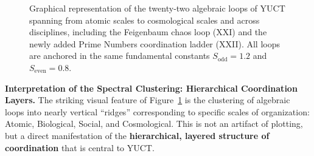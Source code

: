 \documentclass[12pt,a4paper]{article}
\begin{document}
\begin{figure}[htbp]
		\caption{Graphical representation of the twenty-two algebraic loops of YUCT spanning from atomic scales to cosmological scales and across disciplines, including the Feigenbaum chaos loop (XXI) and the newly added Prime Numbers coordination ladder (XXII). All loops are anchored in the same fundamental constants $S_{\mathrm{odd}} = 1.2$ and $S_{\mathrm{even}} = 0.8$.}
		\label{fig:twentyone-loops}
	\end{figure}
	
	\vspace{0.5cm}
	\noindent
	\textbf{Interpretation of the Spectral Clustering: Hierarchical Coordination Layers.}
	The striking visual feature of Figure~\ref{fig:twentyone-loops} is the clustering of algebraic loops into nearly vertical ``ridges'' corresponding to specific scales of organization: Atomic, Biological, Social, and Cosmological. This is not an artifact of plotting, but a direct manifestation of the \textbf{hierarchical, layered structure of coordination} that is central to YUCT.
	
\end{document}
